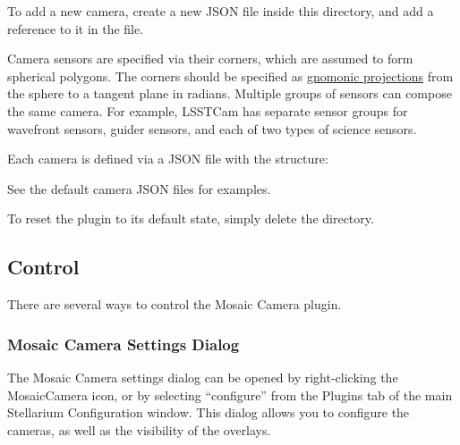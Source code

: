 To add a new camera, create a new JSON file inside this directory, and add a reference to it in the  file.

Camera sensors are specified via their corners, which are assumed to form spherical polygons.
The corners should be specified as \href{https://en.wikipedia.org/wiki/Gnomonic_projection}{gnomonic projections} from the sphere to a tangent plane in radians.
Multiple groups of sensors can compose the same camera.
For example, LSSTCam has separate sensor groups for wavefront sensors, guider sensors, and each of two types of science sensors.


Each camera is defined via a JSON file with the structure:

\begin{jsonfile}
\end{jsonfile}

See the default camera JSON files for examples.

To reset the plugin to its default state, simply delete the  directory.

\subsection{Control}
\label{sec:plugins:MosaicCamera:control}

There are several ways to control the Mosaic Camera plugin.

\subsubsection{Mosaic Camera Settings Dialog}
\label{sec:plugins:MosaicCamera:control:dialog}

The Mosaic Camera settings dialog can be opened by right-clicking the MosaicCamera icon, or by selecting ``configure'' from the Plugins tab of the main Stellarium Configuration window.
This dialog allows you to configure the cameras, as well as the visibility of the overlays.

